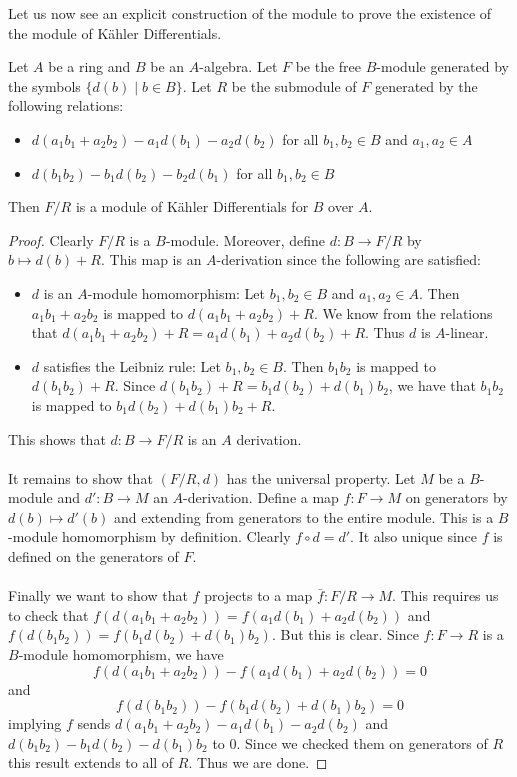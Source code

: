 \documentclass[a4paper]{article}
\begin{document}
Let us now see an explicit construction of the module to prove the existence of the module of Kähler Differentials. 

\begin{prp}{}{} Let $A$ be a ring and $B$ be an $A$-algebra. Let $F$ be the free $B$-module generated by the symbols $\{d(b)\;|\;b\in B\}$. Let $R$ be the submodule of $F$ generated by the following relations: 
\begin{itemize}
\item $d(a_1b_1+a_2b_2)-a_1d(b_1)-a_2d(b_2)$ for all $b_1,b_2\in B$ and $a_1,a_2\in A$
\item $d(b_1b_2)-b_1d(b_2)-b_2d(b_1)$ for all $b_1,b_2\in B$
\end{itemize}
Then $F/R$ is a module of Kähler Differentials for $B$ over $A$. 
\begin{proof}
Clearly $F/R$ is a $B$-module. Moreover, define $d:B\to F/R$ by $b\mapsto d(b)+R$. This map is an $A$-derivation since the following are satisfied: 
\begin{itemize}
\item $d$ is an $A$-module homomorphism: Let $b_1,b_2\in B$ and $a_1,a_2\in A$. Then $a_1b_1+a_2b_2$ is mapped to $d(a_1b_1+a_2b_2)+R$. We know from the relations that $d(a_1b_1+a_2b_2)+R=a_1d(b_1)+a_2d(b_2)+R$. Thus $d$ is $A$-linear. 
\item $d$ satisfies the Leibniz rule: Let $b_1,b_2\in B$. Then $b_1b_2$ is mapped to $d(b_1b_2)+R$. Since $d(b_1b_2)+R=b_1d(b_2)+d(b_1)b_2$, we have that $b_1b_2$ is mapped to $b_1d(b_2)+d(b_1)b_2+R$. 
\end{itemize}
This shows that $d:B\to F/R$ is an $A$ derivation. \\~\\

It remains to show that $(F/R,d)$ has the universal property. Let $M$ be a $B$-module and $d':B\to M$ an $A$-derivation. Define a map $f:F\to M$ on generators by $d(b)\mapsto d'(b)$ and extending from generators to the entire module. This is a $B$-module homomorphism by definition. Clearly $f\circ d=d'$. It also unique since $f$ is defined on the generators of $F$. \\~\\

Finally we want to show that $f$ projects to a map $\bar{f}:F/R\to M$. This requires us to check that $f(d(a_1b_1+a_2b_2))=f(a_1d(b_1)+a_2d(b_2))$ and $f(d(b_1b_2))=f(b_1d(b_2)+d(b_1)b_2)$. But this is clear. Since $f:F\to R$ is a $B$-module homomorphism, we have $$f(d(a_1b_1+a_2b_2))-f(a_1d(b_1)+a_2d(b_2))=0$$ and $$f(d(b_1b_2))-f(b_1d(b_2)+d(b_1)b_2)=0$$ implying $f$ sends $d(a_1b_1+a_2b_2)-a_1d(b_1)-a_2d(b_2)$ and $d(b_1b_2)-b_1d(b_2)-d(b_1)b_2$ to $0$. Since we checked them on generators of $R$ this result extends to all of $R$. Thus we are done. 
\end{proof}
\end{prp}
\end{document}

